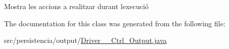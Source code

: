 Mostra les accions a realitzar durant l\textquotesingle{}execució 



The documentation for this class was generated from the following file\+:\begin{DoxyCompactItemize}
\item 
src/persistencia/output/\hyperlink{Driver____Ctrl__Output_8java}{Driver\+\_\+\+\_\+\+Ctrl\+\_\+\+Output.\+java}\end{DoxyCompactItemize}
